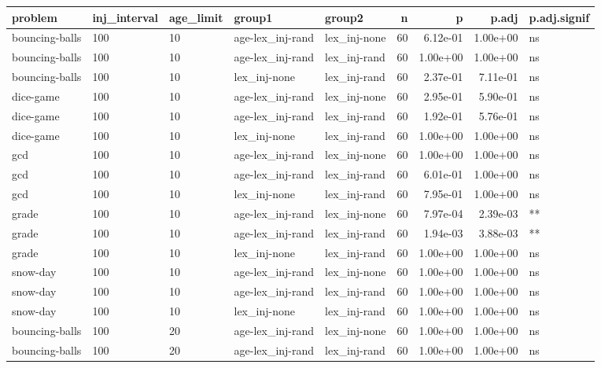 \documentclass[
]{book}
\begin{document}
\begin{table}
\centering
\begin{tabular}[t]{l|l|l|l|l|r|r|r|l}
\hline
problem & inj\_interval & age\_limit & group1 & group2 & n & p & p.adj & p.adj.signif\\
\hline
bouncing-balls & 100 & 10 & age-lex\_inj-rand & lex\_inj-none & 60 & 6.12e-01 & 1.00e+00 & ns\\
\hline
bouncing-balls & 100 & 10 & age-lex\_inj-rand & lex\_inj-rand & 60 & 1.00e+00 & 1.00e+00 & ns\\
\hline
bouncing-balls & 100 & 10 & lex\_inj-none & lex\_inj-rand & 60 & 2.37e-01 & 7.11e-01 & ns\\
\hline
dice-game & 100 & 10 & age-lex\_inj-rand & lex\_inj-none & 60 & 2.95e-01 & 5.90e-01 & ns\\
\hline
dice-game & 100 & 10 & age-lex\_inj-rand & lex\_inj-rand & 60 & 1.92e-01 & 5.76e-01 & ns\\
\hline
dice-game & 100 & 10 & lex\_inj-none & lex\_inj-rand & 60 & 1.00e+00 & 1.00e+00 & ns\\
\hline
gcd & 100 & 10 & age-lex\_inj-rand & lex\_inj-none & 60 & 1.00e+00 & 1.00e+00 & ns\\
\hline
gcd & 100 & 10 & age-lex\_inj-rand & lex\_inj-rand & 60 & 6.01e-01 & 1.00e+00 & ns\\
\hline
gcd & 100 & 10 & lex\_inj-none & lex\_inj-rand & 60 & 7.95e-01 & 1.00e+00 & ns\\
\hline
grade & 100 & 10 & age-lex\_inj-rand & lex\_inj-none & 60 & 7.97e-04 & 2.39e-03 & **\\
\hline
grade & 100 & 10 & age-lex\_inj-rand & lex\_inj-rand & 60 & 1.94e-03 & 3.88e-03 & **\\
\hline
grade & 100 & 10 & lex\_inj-none & lex\_inj-rand & 60 & 1.00e+00 & 1.00e+00 & ns\\
\hline
snow-day & 100 & 10 & age-lex\_inj-rand & lex\_inj-none & 60 & 1.00e+00 & 1.00e+00 & ns\\
\hline
snow-day & 100 & 10 & age-lex\_inj-rand & lex\_inj-rand & 60 & 1.00e+00 & 1.00e+00 & ns\\
\hline
snow-day & 100 & 10 & lex\_inj-none & lex\_inj-rand & 60 & 1.00e+00 & 1.00e+00 & ns\\
\hline
bouncing-balls & 100 & 20 & age-lex\_inj-rand & lex\_inj-none & 60 & 1.00e+00 & 1.00e+00 & ns\\
\hline
bouncing-balls & 100 & 20 & age-lex\_inj-rand & lex\_inj-rand & 60 & 1.00e+00 & 1.00e+00 & ns\\
\hline

\end{tabular}
\end{table}
\end{document}
